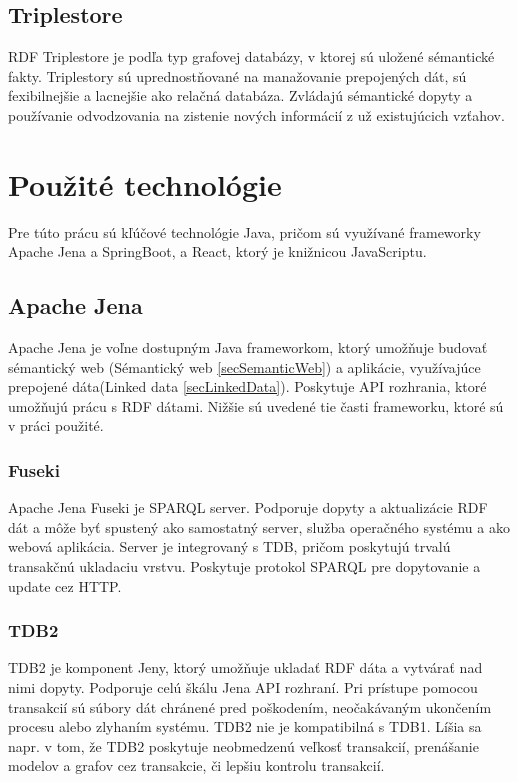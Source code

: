 \subsection{Triplestore} \label{secTriplestore}
RDF Triplestore je podľa \cite{triplestore} typ grafovej databázy, v ktorej sú uložené sémantické
fakty. Triplestory sú uprednostňované na manažovanie prepojených dát, sú fexibilnejšie
a lacnejšie ako relačná databáza. Zvládajú sémantické dopyty a používanie odvodzovania na zistenie nových informácií z už existujúcich vzťahov.

\section{Použité technológie} \label{secTechnologie}
Pre túto prácu sú kľúčové technológie Java, pričom sú využívané frameworky Apache Jena a SpringBoot, a React, ktorý je knižnicou JavaScriptu.

\subsection{Apache Jena} \label{secJena}
Apache Jena {\cite{jena}} je voľne dostupným Java frameworkom, ktorý umožňuje budovať sémantický web (Sémantický web \ref{secSemanticWeb}) a aplikácie, využívajúce prepojené dáta(Linked data \ref{secLinkedData}). Poskytuje API rozhrania, ktoré umožňujú prácu s RDF dátami. Nižšie sú uvedené tie časti frameworku, ktoré sú v práci použité.
\subsubsection{Fuseki}
Apache Jena Fuseki je SPARQL server. Podporuje dopyty a aktualizácie RDF dát a môže byť spustený ako samostatný server, služba operačného systému a ako webová aplikácia. Server je integrovaný s TDB, pričom poskytujú trvalú transakčnú ukladaciu vrstvu. Poskytuje protokol SPARQL pre dopytovanie a
update cez HTTP.

\subsubsection{TDB2}
TDB2 je komponent Jeny, ktorý umožňuje ukladať RDF dáta a vytvárať nad nimi dopyty. Podporuje celú škálu Jena API rozhraní. Pri prístupe pomocou transakcií sú súbory dát chránené pred poškodením, neočakávaným ukončením procesu alebo zlyhaním systému. TDB2 nie je kompatibilná s TDB1. Líšia sa napr. v tom, že TDB2 poskytuje neobmedzenú veľkosť transakcií, prenášanie modelov a grafov cez transakcie, či lepšiu kontrolu transakcií. 

